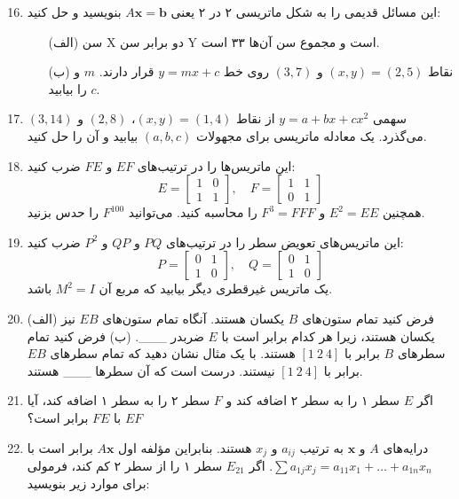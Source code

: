 \documentclass[12pt, a4paper]{book}
\begin{document}
	\begin{enumerate}
		\setcounter{enumi}{15}
		\item این مسائل قدیمی را به شکل ماتریسی ۲ در ۲ یعنی $A\mathbf{x}=\mathbf{b}$ بنویسید و حل کنید:
		\begin{itemize}
			\item[(الف)] سن X دو برابر سن Y است و مجموع سن آن‌ها ۳۳ است.
			\item[(ب)] نقاط $(x,y)=(2,5)$ و $(3,7)$ روی خط $y=mx+c$ قرار دارند. $m$ و $c$ را بیابید.
		\end{itemize}
		\item سهمی $y=a+bx+cx^2$ از نقاط $(x,y)=(1,4)$، $(2,8)$ و $(3,14)$ می‌گذرد. یک معادله ماتریسی برای مجهولات $(a,b,c)$ بیابید و آن را حل کنید.
		\item این ماتریس‌ها را در ترتیب‌های $EF$ و $FE$ ضرب کنید:
		\[ E = \begin{bmatrix} 1 & 0 \\ 1 & 1 \end{bmatrix}, \quad F = \begin{bmatrix} 1 & 1 \\ 0 & 1 \end{bmatrix} \]
		همچنین $E^2=EE$ و $F^3=FFF$ را محاسبه کنید. می‌توانید $F^{100}$ را حدس بزنید.
		\item این ماتریس‌های تعویض سطر را در ترتیب‌های $PQ$ و $QP$ و $P^2$ ضرب کنید:
		\[ P = \begin{bmatrix} 0 & 1 \\ 1 & 0 \end{bmatrix}, \quad Q = \begin{bmatrix} 0 & 1 \\ 1 & 0 \end{bmatrix} \]
		یک ماتریس غیرقطری دیگر بیابید که مربع آن $M^2=I$ باشد.
		\item (الف) فرض کنید تمام ستون‌های $B$ یکسان هستند. آنگاه تمام ستون‌های $EB$ نیز یکسان هستند، زیرا هر کدام برابر است با $E$ ضربدر \_\_\_.
		(ب) فرض کنید تمام سطرهای $B$ برابر با $[1 \ 2 \ 4]$ هستند. با یک مثال نشان دهید که تمام سطرهای $EB$ برابر با $[1 \ 2 \ 4]$ نیستند. درست است که آن سطرها \_\_\_ هستند.
		\item اگر $E$ سطر ۱ را به سطر ۲ اضافه کند و $F$ سطر ۲ را به سطر ۱ اضافه کند، آیا $EF$ با $FE$ برابر است؟
		\item درایه‌های $A$ و $\mathbf{x}$ به ترتیب $a_{ij}$ و $x_j$ هستند. بنابراین مؤلفه اول $A\mathbf{x}$ برابر است با $\sum a_{1j}x_j = a_{11}x_1 + \dots + a_{1n}x_n$. اگر $E_{21}$ سطر ۱ را از سطر ۲ کم کند، فرمولی برای موارد زیر بنویسید:
		\begin{itemize}

\end{itemize}
\end{enumerate}
\end{document}
